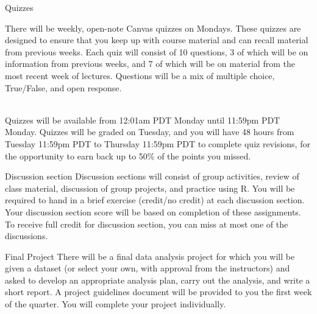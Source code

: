 \documentclass[10pt,t]{beamer}
\begin{document}
\begin{frame}{Quizzes}

There will be weekly, open-note Canvas quizzes on Mondays. These quizzes are designed to ensure that you keep up with course material and can recall material from previous weeks. Each quiz will consist of 10 questions, 3 of which will be on information from previous weeks, and 7 of which will be on material from the most recent week of lectures. Questions will be a mix of multiple choice, True/False, and open response. \\~\

Quizzes will be available from 12:01am PDT Monday until 11:59pm PDT Monday. Quizzes will be graded on Tuesday, and you will have 48 hours from Tuesday 11:59pm PDT to Thursday 11:59pm PDT to complete quiz revisions, for the opportunity to earn back up to 50\% of the points you missed.

\end{frame}


\begin{frame}{Discussion section}
Discussion sections will consist of group activities, review of class material, discussion of group projects, and practice using R. You will be required to hand in a brief exercise (credit/no credit) at each discussion section. Your discussion section score will be based on completion of these assignments. To receive full credit for discussion section, you can miss at most one of the discussions.
\end{frame}

\begin{frame}{Final Project}
There will be a final data analysis project for which you will be given a dataset (or select your own, with approval from the instructors) and asked to develop an appropriate analysis plan, carry out the analysis, and write a short report. A project guidelines document will be provided to you the first week of the quarter. You will complete your project individually.
\end{frame}
\end{document}
